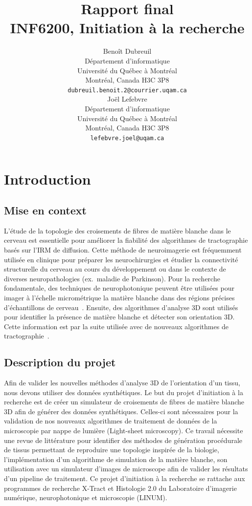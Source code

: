 \documentclass{article}
\title{
  Rapport final \\
  INF6200, Initiation à la recherche}
\author{
  Benoît Dubreuil \\
  Département d'informatique \\
  Université du Québec à Montréal \\
  Montréal, Canada H3C 3P8 \\
  \texttt{dubreuil.benoit.2@courrier.uqam.ca} \\
  \And
  Joël Lefebvre \\
  Département d'informatique\\
  Université du Québec à Montréal \\
  Montréal, Canada H3C 3P8\\
  \texttt{lefebvre.joel@uqam.ca} \\
}
\begin{document}
  \maketitle


  \section{Introduction}
  \label{sec:introduction}

  \subsection{Mise en context}
  \label{subsec:mise-en-context}
  L'étude de la topologie des croisements de fibres de matière blanche dans le cerveau est essentielle pour améliorer la fiabilité des algorithmes de tractographie
  basés sur l'IRM de diffusion.
  Cette méthode de neuroimagerie est fréquemment utilisée en clinique pour préparer les neurochirurgies et étudier la connectivité structurelle du cerveau au cours du
  développement ou dans le contexte de diverses neuropathologies (ex.\ maladie de Parkinson).
  Pour la recherche fondamentale, des techniques de neurophotonique peuvent être utilisées pour imager à l’échelle micrométrique la matière blanche dans des régions
  précises d'échantillons de cerveau~\citep{lefebvre2021oct}.
  Ensuite, des algorithmes d'analyse 3D sont utilisés pour identifier la présence de matière blanche et détecter son orientation 3D\@.
  Cette information est par la suite utilisée avec de nouveaux algorithmes de tractographie~\citep{oliveirasicard2021orientation3d}.

  \subsection{Description du projet}
  \label{subsec:description-du-projet}
  Afin de valider les nouvelles méthodes d'analyse 3D de l'orientation d’un tissu, nous devons utiliser des données synthétiques.
  Le but du projet d'initiation à la recherche est de créer un simulateur de croisements de fibres de matière blanche 3D afin de générer des données synthétiques.
  Celles-ci sont nécessaires pour la validation de nos nouveaux algorithmes de traitement de données de la microscopie par nappe de lumière (Light-sheet microscopy).
  Ce travail nécessite une revue de littérature pour identifier des méthodes de génération procédurale de tissus permettant de reproduire une topologie inspirée de
  la biologie, l'implémentation d'un algorithme de simulation de la matière blanche, son utilisation avec un simulateur d'images de microscope afin de valider les
  résultats d'un pipeline de traitement.
  Ce projet d'initiation à la recherche se rattache aux programmes de recherche X-Tract et Histologie 2.0 du Laboratoire d’imagerie numérique, neurophotonique et
  microscopie (LINUM).
\end{document}
